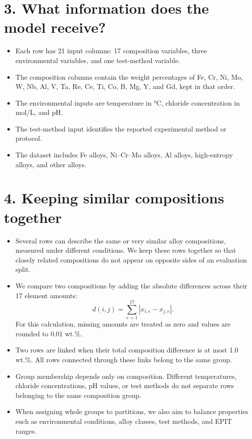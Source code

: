 \documentclass[11pt]{article}
\newenvironment{notes}
  {\begin{itemize}\setlength{\itemsep}{0.45em}\setlength{\parsep}{0pt}}
  {\end{itemize}}
\begin{document}
\section*{3. What information does the model receive?}

\begin{notes}

    \item Each row has 21 input columns: 17 composition variables, three environmental
    variables, and one test-method variable.

    \item The composition columns contain the weight percentages of Fe, Cr, Ni, Mo, W, Nb,
    Al, V, Ta, Re, Ce, Ti, Co, B, Mg, Y, and Gd, kept in that order.

    \item The environmental inputs are temperature in °C, chloride concentration in mol/L,
    and pH.

    \item The test-method input identifies the reported experimental method or protocol.

    \item The dataset includes Fe alloys, Ni–Cr–Mo alloys, Al alloys, high-entropy alloys,
    and other alloys.

\end{notes}

\section*{4. Keeping similar compositions together}

\begin{notes}

    \item Several rows can describe the same or very similar alloy compositions, measured
    under different conditions. We keep these rows together so that closely related
    compositions do not appear on opposite sides of an evaluation split.

    \item We compare two compositions by adding the absolute differences across their 17
    element amounts:
    \[
    d(i,j)=\sum_{e=1}^{17}|x_{i,e}-x_{j,e}|.
    \]
    For this calculation, missing amounts are treated as zero and values are rounded to 0.01
    wt.\%.

    \item Two rows are linked when their total composition difference is at most 1.0 wt.\%.
    All rows connected through these links belong to the same group.

    \item Group membership depends only on composition. Different temperatures, chloride
    concentrations, pH values, or test methods do not separate rows belonging to the same
    composition group.

    \item When assigning whole groups to partitions, we also aim to balance properties such
    as environmental conditions, alloy classes, test methods, and EPIT ranges.

\end{notes}
\end{document}
